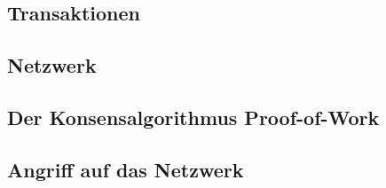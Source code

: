 \subsection{Transaktionen}
\subsection{Netzwerk}
\subsection{Der Konsensalgorithmus Proof-of-Work}
\subsection{Angriff auf das Netzwerk}

